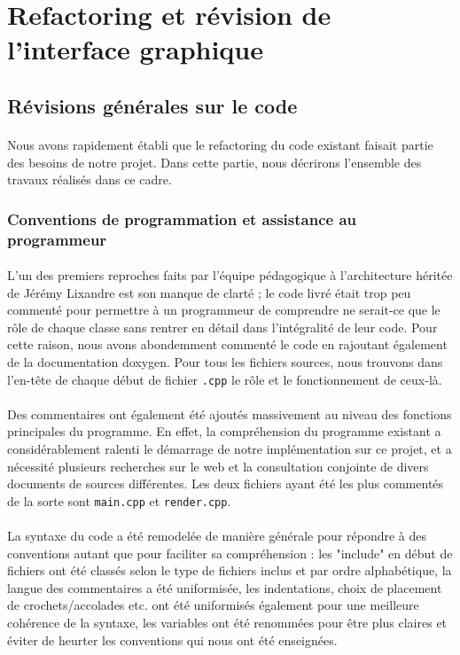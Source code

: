 \section{Refactoring et révision de l'interface graphique}

\subsection{Révisions générales sur le code}
\paragraph{}
Nous avons rapidement établi que le refactoring du code existant
faisait partie des besoins de notre projet. Dans cette partie, nous
décrirons l'ensemble des travaux réalisés dans ce cadre.

\subsubsection{Conventions de programmation et assistance au programmeur}
\paragraph{}
L'un des premiers reproches faits par l'équipe pédagogique à
l'architecture héritée de Jérémy Lixandre est son manque de clarté ;
le code livré était trop peu commenté pour permettre à un programmeur
de comprendre ne serait-ce que le rôle de chaque classe sans rentrer
en détail dans l'intégralité de leur code. Pour cette raison, nous
avons abondemment commenté le code en rajoutant également de la documentation
doxygen. Pour tous les fichiers sources, nous trouvons dans l'en-tête de chaque
début de fichier \verb!.cpp! le rôle et le fonctionnement de ceux-là.
\paragraph{}
Des commentaires ont également été ajoutés massivement au niveau des
fonctions principales du programme. En effet, la compréhension du
programme existant a considérablement ralenti le démarrage de notre
implémentation sur ce projet, et a nécessité plusieurs recherches sur
le web et la consultation conjointe de divers documents de sources
différentes. Les deux fichiers ayant été les plus commentés de la
sorte sont \verb!main.cpp! et \verb!render.cpp!.
\paragraph{}
La syntaxe du code a été remodelée de manière générale pour répondre à
des conventions autant que pour faciliter sa compréhension : les
"include" en début de fichiers ont été classés selon le type de
fichiers inclus et par ordre alphabétique, la langue des commentaires
a été uniformisée, les indentations, choix de placement de
crochets/accolades etc. ont été uniformisés également pour une
meilleure cohérence de la syntaxe, les variables ont été renommées
pour être plus claires et éviter de heurter les conventions qui nous
ont été enseignées.


